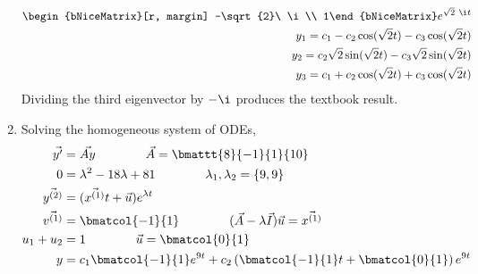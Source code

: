 \begin{enumerate}
\begin{align}
\begin{bNiceMatrix}[r, margin]
                        -\sqrt{2}\ \i  \\
                        1\end{bNiceMatrix}e^{\sqrt{2}\ \i t}
              \\
              y_1 = c_1 - c_2\cos(\sqrt{2}t) - c_3\cos(\sqrt{2}t)           \\
              y_2 = c_2\sqrt{2}\sin(\sqrt{2}t) - c_3\sqrt{2}\sin(\sqrt{2}t) \\
              y_3 = c_1 + c_2\cos(\sqrt{2}t) + c_3\cos(\sqrt{2}t)
          \end{align}
          Dividing the third eigenvector by $ -\i $ produces the textbook result.

    \item Solving the homogeneous system of ODEs,
          \begin{align}
              \vec{y'}      & = \vec{Ay}
              \qquad\qquad
              \vec{A}                           = \bmattt{8}{-1}{1}{10} \\
              0             & = \lambda^{2} - 18\lambda + 81
              \qquad\qquad
              \lambda_1, \lambda_2              = \left\{ 9, 9 \right\} \\
              \vec{y^{(2)}} & = (\vec{x^{(1)}}t + \vec{u})e^{\lambda t} \\
              \vec{v^{(1)}} & = \bmatcol{-1}{1}
              \qquad\qquad
              (\vec{A} - \lambda\vec{I})\vec{u} = \vec{x^{(1)}}         \\
              u_1 + u_2     & = 1
              \qquad\qquad
              \vec{u}                           = \bmatcol{0}{1}        \\
              y             & = c_1 \bmatcol{-1}{1}e^{9t}
              + c_2\left( \bmatcol{-1}{1}t + \bmatcol{0}{1} \right)e^{9t}
          \end{align}


\end{enumerate}

